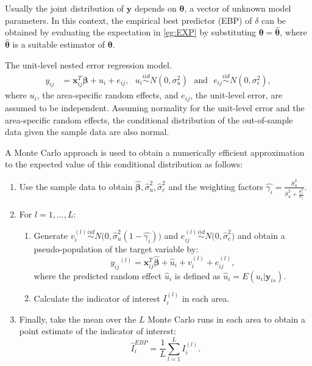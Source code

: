 \documentclass[a4paper, 11pt]{article}
\begin{document}
Usually the joint distribution of $\boldsymbol{y}$ depends on $\boldsymbol{\theta}$, a vector of unknown model parameters. In this context, the empirical best predictor (EBP) of $\delta$ can be obtained by evaluating the expectation in \ref{eg:EXP} by substituting $\boldsymbol{\theta}=\boldsymbol{\hat{\theta}}$, where $\boldsymbol{\hat{\theta}}$ is a suitable estimator of $\boldsymbol{\theta}$.   


The unit-level nested error regression model.
\begin{align}\label{eq:battese}
y_{ij}&=\mathbf{x}_{ij}^{T}\boldsymbol\beta + u_i + e_{ij}, \,\,\,\,u_i \overset{iid}{\sim} N(0,\sigma^2_u)\,\,\,\,\text{and}\,\,\,\,e_{ij} \overset{iid}{\sim}N(0,\sigma^2_e),
\end{align}
where $u_i$, the area-specific random effects, and $e_{ij}$, the unit-level error, are assumed to be independent. Assuming normality for the unit-level error and the area-specific random effects, the conditional distribution of the out-of-sample data given the sample data are also normal.  

A Monte Carlo approach is used to obtain a numerically efficient approximation to the expected value of this conditional distribution as follows:
\begin{enumerate}
	\item
	Use the sample data to obtain $\hat{{\boldsymbol{\beta}}},\hat{\sigma}_u^2,\hat{\sigma}_e^2$ and the weighting factors $\hat{\gamma_i}=\frac{\hat{\sigma}_u^2}{\hat{\sigma}_u^2 + \frac{\hat{\sigma}_e^2}{n_i}  }$.
	\item
	For $l=1,\ldots,L$:
	\begin{enumerate}
		\item
		Generate ${v}_i^{(l)} \overset{iid}{\sim} N\big(0,\hat{\sigma}_u^2(1-\hat{\gamma_i})\big)$ and  $e_{ij}^{(l)}\overset{iid}{\sim}N\big(0,\hat{\sigma}_e^2\big)$ and obtain a pseudo-population of the target variable by: $${{y}_{ij}}{}^{(l)}=\mathbf{x}_{ij}^{T}\hat{{\boldsymbol{\beta}}}+\hat u_{i}+v_{i}^{(l)}+e_{ij}^{(l)},$$ where the predicted random effect $\hat u_{i}$ is defined as $\hat u_{i}=E(u_i|\mathbf{y}_{is})$.
		\item
		Calculate the indicator of interest $I_i^{(l)}$ in each area.
	\end{enumerate}
	\item
	Finally, take the mean over the $L$ Monte Carlo runs in each area to obtain a point estimate of the indicator of interest: $$\hat{I}_{i}^{EBP} = \frac{1}{L} \sum\limits_{l=1}^{L}{I}_i^{(l)}.$$
\end{enumerate}
\end{document}
